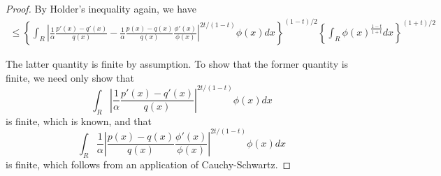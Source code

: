 \begin{proof}
By Holder's inequality again, we have 
\begin{align*}
\leq \left\{  \int_R \left| \frac{1}{\alpha} \frac{p'(x) - q'(x)}{q(x)} 
                       - \frac{1}{\alpha} \frac{p(x) - q(x)}{q(x)} \frac{\phi'(x)}{\phi(x)}\right|^{2t/(1-t)} \phi(x) dx \right\}^{(1-t)/2} 
 \left\{ \int_R \phi(x)^{\frac{1-t}{1+t}} dx \right\}^{(1+t)/2} 
\end{align*}
      
The latter quantity is finite by assumption. To show that the former quantity is finite, we need only show that
\[
 \int_R \left| \frac{1}{\alpha} \frac{p'(x) - q'(x)}{q(x)} \right|^{2t/(1-t)} \phi(x) dx 
\] 
is finite, which is known, and that
\[
\int_R \frac{1}{\alpha} \left| \frac{p(x) - q(x)}{q(x)}  \frac{\phi'(x)}{\phi(x)}\right|^{2t/(1-t)} \phi(x) dx
\]
is finite, which follows from an application of Cauchy-Schwartz.  




\end{proof}



